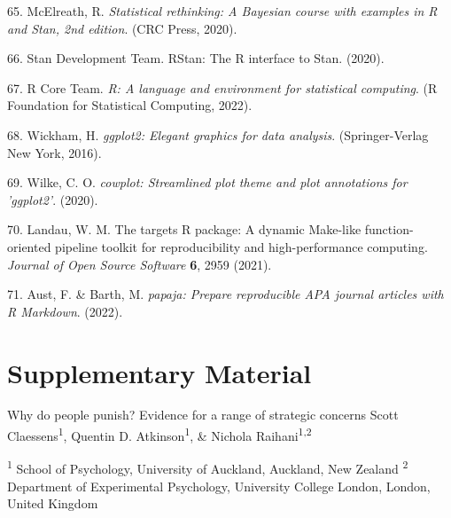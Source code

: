 \documentclass[
  english,
  man, donotrepeattitle,floatsintext]{apa6}
\newenvironment{cslreferences}%
  {}%
  {\par}
\begin{document}
\begin{cslreferences}
\leavevmode\hypertarget{ref-McElreath2020}{}%
65. McElreath, R. \emph{Statistical rethinking: A Bayesian course with examples in R and Stan, 2nd edition}. (CRC Press, 2020).

\leavevmode\hypertarget{ref-Stan2020}{}%
66. Stan Development Team. RStan: The R interface to Stan. (2020).

\leavevmode\hypertarget{ref-RCoreTeam}{}%
67. R Core Team. \emph{R: A language and environment for statistical computing}. (R Foundation for Statistical Computing, 2022).

\leavevmode\hypertarget{ref-Wickham2016}{}%
68. Wickham, H. \emph{ggplot2: Elegant graphics for data analysis}. (Springer-Verlag New York, 2016).

\leavevmode\hypertarget{ref-Wilke2020}{}%
69. Wilke, C. O. \emph{cowplot: Streamlined plot theme and plot annotations for 'ggplot2'}. (2020).

\leavevmode\hypertarget{ref-Landau2021}{}%
70. Landau, W. M. The targets R package: A dynamic Make-like function-oriented pipeline toolkit for reproducibility and high-performance computing. \emph{Journal of Open Source Software} \textbf{6}, 2959 (2021).

\leavevmode\hypertarget{ref-Aust2022}{}%
71. Aust, F. \& Barth, M. \emph{papaja: Prepare reproducible APA journal articles with R Markdown}. (2022).
\end{cslreferences}

\endgroup

\newpage
\vspace*{60mm}

\renewcommand{\figurename}{Supplementary Figure}
\renewcommand{\tablename}{Supplementary Table}
\renewcommand{\thefigure}{S\arabic{figure}} \setcounter{figure}{0}
\renewcommand{\thetable}{S\arabic{table}} \setcounter{table}{0}
\renewcommand{\theequation}{S\arabic{equation}} \setcounter{equation}{0}

\hypertarget{supplementary-material}{%
\section{\texorpdfstring{\textbf{Supplementary Material}}{Supplementary Material}}\label{supplementary-material}}

\setcounter{page}{1}
\centering

\noindent \hspace*{25mm} \small Why do people punish? Evidence for a range of strategic concerns \newline
\hspace*{30mm} \small Scott Claessens\textsuperscript{1}, Quentin D. Atkinson\textsuperscript{1}, \& Nichola Raihani\textsuperscript{1,2} \newline
\raggedright
\noindent \footnotesize \textsuperscript{1} School of Psychology, University of Auckland, Auckland, New Zealand \newline
\noindent \footnotesize \textsuperscript{2} Department of Experimental Psychology, University College London, London, United Kingdom \newline
\end{document}
